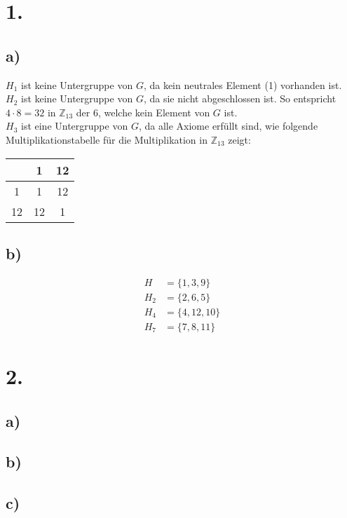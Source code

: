 \documentclass[a4paper]{scrartcl}
\title{\titleinfo}
\author{Arne Struck 6326505}
\date{\today}
\begin{document}
\maketitle
\notag
\section{1.}
	\subsection{a)}		
		\(H_1\) ist keine Untergruppe von \(G\), da kein neutrales Element (1) vorhanden ist. \\
		\(H_2\) ist keine Untergruppe von \(G\), da sie nicht abgeschlossen ist. So entspricht 
		\(4\cdot 8 = 32\) in \(\mathbb{Z}_{13}\) der 6, welche kein Element von \(G\) ist. \\
		\(H_3\) ist eine Untergruppe von \(G\), da alle Axiome erfüllt sind, wie folgende 
		Multiplikationstabelle für die Multiplikation in \(\mathbb{Z}_{13}\) zeigt: \\
		\begin{center}
			\begin{tabular}{c||c|c}
				&1&12 \\ \hline\hline
				1&1&12 \\ \hline
				12&12&1			
			\end{tabular}
		\end{center}
		
	\subsection{b)}
		\begin{align}
			H &= \{1,3,9\} \\
			H_2 &= \{2,6,5\} \\
			H_4 &= \{4,12,10\} \\
			H_7 &= \{7,8,11\}
		\end{align}
		
	
\section{2.}
	\subsection{a)}
	\subsection{b)}
	\subsection{c)}
	
\end{document}

